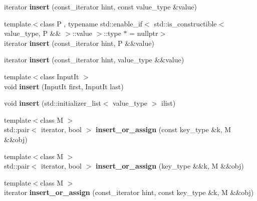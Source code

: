 \begin{DoxyCompactItemize}
iterator {\bfseries insert} (const\+\_\+iterator hint, const value\+\_\+type \&value)
\item 
\mbox{\label{classtsl_1_1robin__map_a85c637a58ac0e7bbbca26ffdbb544541}} 
{\footnotesize template$<$class P , typename std\+::enable\+\_\+if$<$ std\+::is\+\_\+constructible$<$ value\+\_\+type, P \&\& $>$\+::value $>$\+::type $\ast$  = nullptr$>$ }\\iterator {\bfseries insert} (const\+\_\+iterator hint, P \&\&value)
\item 
\mbox{\label{classtsl_1_1robin__map_af6248658bc881c74d15c56880ae2965d}} 
iterator {\bfseries insert} (const\+\_\+iterator hint, value\+\_\+type \&\&value)
\item 
\mbox{\label{classtsl_1_1robin__map_a7f7cc7cdf3d3a5914df557ebf39690fd}} 
{\footnotesize template$<$class Input\+It $>$ }\\void {\bfseries insert} (Input\+It first, Input\+It last)
\item 
\mbox{\label{classtsl_1_1robin__map_a73f8bfa9341be61c1b8b31a875e8141e}} 
void {\bfseries insert} (std\+::initializer\+\_\+list$<$ value\+\_\+type $>$ ilist)
\item 
\mbox{\label{classtsl_1_1robin__map_af837b3658d774c69ce8f8e88432cfd6f}} 
{\footnotesize template$<$class M $>$ }\\std\+::pair$<$ iterator, bool $>$ {\bfseries insert\+\_\+or\+\_\+assign} (const key\+\_\+type \&k, M \&\&obj)
\item 
\mbox{\label{classtsl_1_1robin__map_a407602d782c48fad3d1b5517fead033f}} 
{\footnotesize template$<$class M $>$ }\\std\+::pair$<$ iterator, bool $>$ {\bfseries insert\+\_\+or\+\_\+assign} (key\+\_\+type \&\&k, M \&\&obj)
\item 
\mbox{\label{classtsl_1_1robin__map_a810a54b40184a4452ba740039e2d5c87}} 
{\footnotesize template$<$class M $>$ }\\iterator {\bfseries insert\+\_\+or\+\_\+assign} (const\+\_\+iterator hint, const key\+\_\+type \&k, M \&\&obj)
\item 

\end{DoxyCompactItemize}
